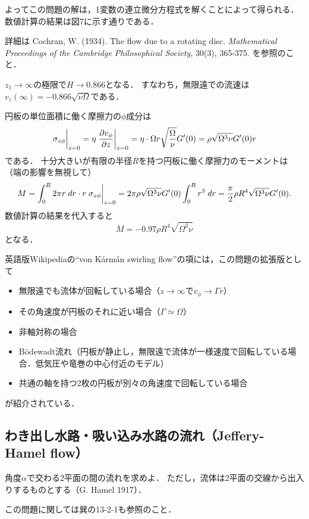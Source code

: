 よってこの問題の解は，1変数の連立微分方程式を解くことによって得られる．数値計算の結果は図7に示す通りである．
\begin{details}
詳細は
Cochran, W. (1934). The flow due to a rotating disc. \textit{Mathematical Proceedings of the Cambridge Philosophical Society}, 30(3), 365-375.
を参照のこと．
\end{details}

$z_1\to\infty$の極限で$H\to0.866$となる．
すなわち，無限遠での流速は$v_z(\infty) = -0.866\sqrt{\nu\Omega}$である．


円板の単位面積に働く摩擦力の$\phi$成分は
\[
    \eval{\sigma_{z\phi}}_{z=0} = \eta\eval{\pdv{v_\phi}{z}}_{z=0}
    = \eta \cdot \Omega r \sqrt{\frac{\Omega}{\nu}} G'(0)
    = \rho \sqrt{\Omega^3\nu} G'(0) r
\]
である．
十分大きいが有限の半径$R$を持つ円板に働く摩擦力のモーメントは（端の影響を無視して）
\[
    M = \int_{0}^{R} 2\pi r \; dr \cdot r \eval{\sigma_{z\phi}}_{z=0}
    = 2\pi\rho \sqrt{\Omega^3\nu} G'(0) \int_{0}^{R} r^3 \; dr
    = \frac{\pi}{2} \rho R^4 \sqrt{\Omega^3\nu} G'(0).
\]
数値計算の結果を代入すると
\begin{equation}
    M = -0.97 \rho R^4 \sqrt{\Omega^3\nu}
\end{equation}
となる．


\begin{details}
英語版Wikipediaの``von K\'{a}rm\'{a}n swirling flow''の項には，この問題の拡張版として
\begin{itemize}
    \item 無限遠でも流体が回転している場合（$z\to\infty$で$v_\phi\to\Gamma r$）
    \item その角速度が円板のそれに近い場合（$\Gamma\simeq\Omega$）
    \item 非軸対称の場合
    \item B\"{o}dewadt流れ（円板が静止し，無限遠で流体が一様速度で回転している場合．低気圧や竜巻の中心付近のモデル）
    \item 共通の軸を持つ2枚の円板が別々の角速度で回転している場合
\end{itemize}
が紹介されている．
\end{details}




\subsection*{わき出し水路・吸い込み水路の流れ（Jeffery-Hamel flow）}

\begin{myitembox}
角度$\alpha$で交わる2平面の間の流れを求めよ．
ただし，流体は2平面の交線から出入りするものとする（G. Hamel 1917）．
\end{myitembox}
\begin{details}
この問題に関しては巽の13-2-1も参照のこと．
\end{details}


